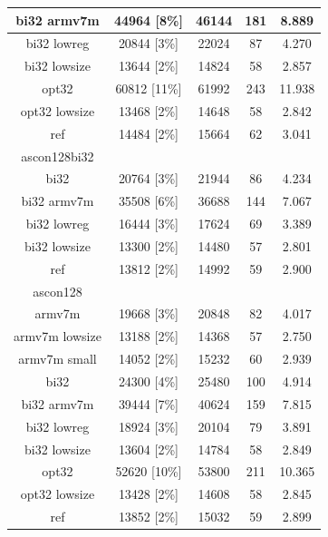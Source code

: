 \documentclass[12pt,a4paper,italian]{report}
\begin{document}
\begin{table}[h]
\begin{tabular}{|c|c|c|c|c|}
        \hline
        bi32 armv7m & 44964 [8\%] & 46144 & 181 & 8.889 \\
        \hline
        bi32 lowreg & 20844 [3\%] & 22024 & 87 & 4.270 \\
        \hline
        bi32 lowsize & 13644 [2\%] & 14824 & 58 & 2.857 \\
        \hline
        opt32 & 60812 [11\%] & 61992 & 243 & 11.938 \\
        \hline
        opt32 lowsize & 13468 [2\%] & 14648 & 58 & 2.842 \\
        \hline
        ref & 14484 [2\%] & 15664 & 62 & 3.041 \\
        \hline
        ascon128bi32 & & & & \\
        \hline
        bi32 & 20764 [3\%] & 21944 & 86 & 4.234 \\
        \hline
        bi32 armv7m & 35508 [6\%] & 36688 & 144 & 7.067 \\
        \hline
        bi32 lowreg & 16444 [3\%] & 17624 & 69 & 3.389 \\
        \hline
        bi32 lowsize & 13300 [2\%] & 14480 & 57 & 2.801 \\
        \hline
        ref & 13812 [2\%] & 14992 & 59 & 2.900 \\
        \hline
        ascon128 & & & & \\
        \hline
        armv7m & 19668 [3\%] & 20848 & 82 & 4.017 \\
        \hline
        armv7m lowsize & 13188 [2\%] & 14368 & 57 & 2.750 \\
        \hline
        armv7m small & 14052 [2\%] & 15232 & 60 & 2.939 \\
        \hline
        bi32 & 24300 [4\%] & 25480 & 100 & 4.914 \\
        \hline
        bi32 armv7m & 39444 [7\%] & 40624 & 159 & 7.815 \\
        \hline
        bi32 lowreg & 18924 [3\%] & 20104 & 79 & 3.891 \\
        \hline
        bi32 lowsize & 13604 [2\%] & 14784 & 58 & 2.849 \\
        \hline
        opt32 & 52620 [10\%] & 53800 & 211 & 10.365 \\
        \hline
        opt32 lowsize & 13428 [2\%] & 14608 & 58 & 2.845 \\
        \hline
        ref & 13852 [2\%] & 15032 & 59 & 2.899 \\
        \hline
    \end{tabular}
\end{table}
\end{document}
